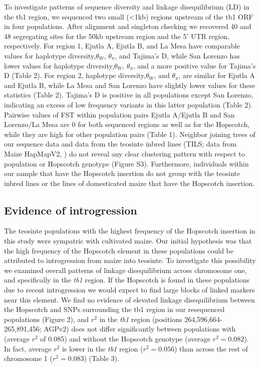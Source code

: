 \documentclass[12pt]{article}
\begin{document}
To investigate patterns of sequence diversity and linkage disequilibrium (LD) in the tb1 region, we sequenced two small (<1kb) regions upstream of the tb1 ORF in four populations. After alignment and singleton checking we recovered 40 and 48 segregating sites for the 50kb upstream region and the 5' UTR region, respectively. For region 1, Ejutla A, Ejutla B, and La Mesa have comparable values for haplotype diversity,$\theta_{W}$, $\theta_{\pi}$, and Tajima's D, while San Lorenzo has lower values for haplotype diversity,$\theta_{W}$, $\theta_{\pi}$, and a more positive value for Tajima's D (Table 2). For region 2, haplotype diversity,$\theta_{W}$, and $\theta_{\pi}$, are similar for Ejutla A and Ejutla B, while La Mesa and San Lorenzo have slightly lower values for these statistics (Table 2). Tajima's D is positive in all populations except San Lorenzo, indicating an excess of low frequency variants in this latter population (Table 2). Pairwise values of FST within population pairs Ejutla A/Ejutla B and San Lorenzo/La Mesa are 0 for both sequenced regions as well as for the Hopscotch, while they are high for other population pairs (Table 1). Neighbor joining trees of our sequence data and data from the teosinte inbred lines (TILS; data from Maize HapMapV2, \cite{Chia et al 2012}) do not reveal any clear clustering pattern with respect to population or Hopscotch genotype (Figure S3). Furthermore, individuals within our sample that have the Hopscotch insertion do not group with the teosinte inbred lines or the lines of domesticated maize that have the Hopscotch insertion. 

\subsection{Evidence of introgression}

The teosinte populations with the highest frequency of the Hopscotch insertion in this study were sympatric with cultivated maize. Our initial hypothesis was that the high frequency of the Hopscotch element in these populations could be attributed to introgression from maize into teosinte. To investigate this possibility we examined overall patterns of linkage disequilibrium across chromosome one, and specifically in the \emph{tb1} region. If the Hopscotch is found in these populations due to recent introgression we would expect to find large blocks of linked markers near this element. We find no evidence of elevated linkage disequilibrium between the Hopscotch and SNPs surrounding the tb1 region in our resequenced populations (Figure 2), and $r^{2}$ in the \emph{tb1} region (positions 264,596,664-265,891,456; AGPv2) does not differ significantly between populations with (average $r^{2}$ of 0.085) and without the Hopscotch genotype (average $r^{2}=0.082$). In fact, average $r^{2}$ is lower in the \emph{tb1} region ($r^{2}=0.056$) than across the rest of chromosome 1 ($r^{2}=0.083$) (Table 3). 
\end{document}
